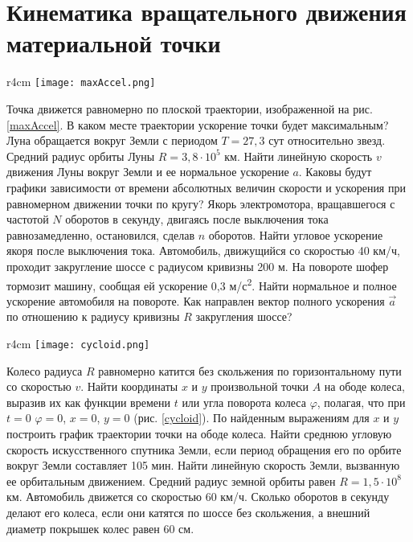 \section{Кинематика вращательного движения материальной точки}
\begin{wrapfigure}[8]{r}{4cm}
\texttt{[image: maxAccel.png]}
\caption{}
\label{maxAccel}
\end{wrapfigure}
\AddProb Точка движется равномерно по плоской траектории, изображенной на рис. \ref{maxAccel}. В каком месте траектории ускорение точки будет максимальным?
\AddProb Луна обращается вокруг Земли с периодом $T = 27,3$ сут относительно звезд. Средний радиус орбиты Луны $R = 3,8 \cdot 10^5$ км. Найти линейную скорость $v$ движения Луны вокруг Земли и ее нормальное ускорение $a$. 
\AddProb Каковы будут графики зависимости от времени абсолютных величин скорости и ускорения при равномерном движении точки по кругу?
\AddProb Якорь электромотора, вращавшегося с частотой $N$ оборотов в секунду, двигаясь после выключения тока равнозамедленно, остановился, сделав $n$ оборотов. Найти угловое ускорение якоря после выключения тока.
\AddProb Автомобиль, движущийся со скоростью 40 км/ч, проходит закругление шоссе с радиусом кривизны 200 м. На повороте шофер тормозит машину, сообщая ей ускорение 0,3 м/с\textsuperscript{2}. Найти нормальное и полное ускорение автомобиля на повороте. Как направлен вектор полного ускорения $\vec{a}$ по отношению к радиусу кривизны $R$ закругления шоссе?
\begin{wrapfigure}[9]{r}{4cm}
\texttt{[image: cycloid.png]}
\caption{}
\label{cycloid}
\end{wrapfigure}
\AddProb Колесо радиуса $R$ равномерно катится без скольжения по горизонтальному пути со скоростью $v$. Найти координаты $x$ и $y$ произвольной точки $A$ на ободе колеса, выразив их как функции времени $t$ или угла поворота колеса $\varphi$, полагая, что при $t = 0$ $\varphi = 0$, $x = 0$, $y = 0$ (рис. \ref{cycloid}). По найденным выражениям для $x$ и $y$ построить график траектории точки на ободе колеса.
\AddProb Найти среднюю угловую скорость искусственного спутника Земли, если период обращения его по орбите вокруг Земли составляет 105 мин.
\AddProb Найти линейную скорость Земли, вызванную ее орбитальным движением. Средний радиус земной орбиты равен $R = 1,5 \cdot 10^8$ км.
\AddProb Автомобиль движется со скоростью 60 км/ч. Сколько оборотов в секунду делают его колеса, если они катятся по шоссе без скольжения, а внешний диаметр покрышек колес равен 60 см.
